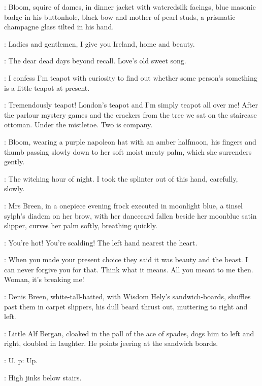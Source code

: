 :
Bloom,
squire of dames,
in dinner jacket with wateredsilk facings,
blue masonic badge in his buttonhole,
black bow and mother-of-pearl studs,
a prismatic champagne glass tilted in his hand.

\Bloom:
Ladies and gentlemen,
I give you Ireland,
home and beauty.

\MrsBreen:
The dear dead days beyond recall.
Love's old sweet song.

\Bloom:
I confess I'm teapot with curiosity to find out
whether some person's something is a little teapot at present.

\MrsBreen:
Tremendously teapot!
London's teapot and I'm simply teapot all over me!
After the parlour mystery games and the crackers from the tree
we sat on the staircase ottoman.
Under the mistletoe.
Two is company.

:
Bloom,
wearing a purple napoleon hat with an amber halfmoon,
his fingers and thumb passing slowly down to her soft moist meaty palm,
which she surrenders gently.

\Bloom:
The witching hour of night.
I took the splinter out of this hand,
carefully,
slowly.

:
Mrs Breen,
in a onepiece evening frock executed in moonlight blue,
a tinsel sylph's diadem on her brow,
with her dancecard fallen beside her moonblue satin slipper,
curves her palm softly,
breathing quickly.

\MrsBreen:
You're hot!
You're scalding!
The left hand nearest the heart.

\Bloom:
When you made your present choice
they said it was beauty and the beast.
I can never forgive you for that.
Think what it means.
All you meant to me then.
Woman,
it's breaking me!

:
Denis Breen,
white-tall-hatted,
with Wisdom Hely's sandwich-boards,
shuffles past them in carpet slippers,
his dull beard thrust out,
muttering to right and left.

:
Little Alf Bergan,
cloaked in the pall of the ace of spades,
dogs him to left and right,
doubled in laughter.
He points jeering at the sandwich boards.

\AlfBergan:
U.
p:
Up.

\MrsBreen:
High jinks below stairs.

